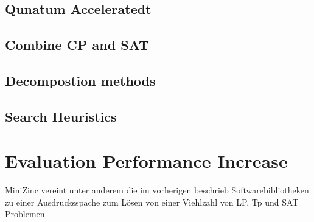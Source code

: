   
\subsection{Qunatum Acceleratedt}
\label{sec:Qunatum Accelerated}

  
\subsection{Combine CP and SAT}
\label{sec:Combine CP and SAT}

  
\subsection{Decompostion methods}
\label{sec:Decompostion methods}

  
\subsection{Search Heuristics}
\label{sec:Search Heuristics}


\section{Evaluation Performance Increase}
\label{sec:Evaluation Performance Increase}

MiniZinc vereint unter anderem die im vorherigen beschrieb
Softwarebibliotheken zu einer Ausdrucksspache zum Lösen von einer Viehlzahl von 
LP, Tp und SAT Problemen. \cite{MiniZwe}




\printbibliography[heading=bibintoc]





